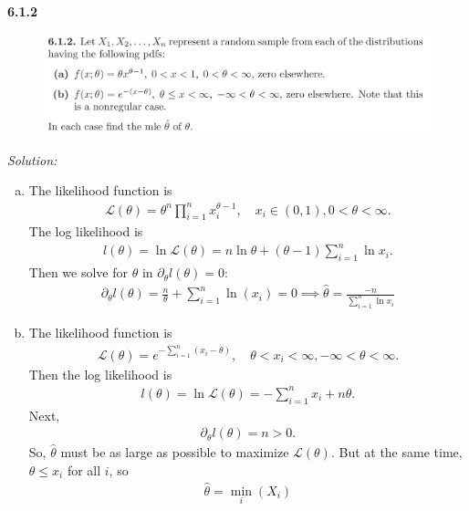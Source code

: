 \documentclass{book}
\theoremstyle{definition}
\newcommand{\p}{\partial}
\newcommand{\lag}{\mathcal{L}}
\newcommand{\f}[2]{\frac{#1}{#2}}
\begin{document}
\newpage
\noindent \textbf{6.1.2}
\begin{figure}[!htb]
	\centering
	\includegraphics[scale=0.25]{612}
\end{figure}


\noindent \textit{Solution:} 
\begin{enumerate}[(a)]
	\item The likelihood function is 
	\begin{align}
	\lag(\theta) = \theta^n \prod^n_{i=1} x_i^{\theta - 1}, \quad x_i \in (0,1), 0 < \theta < \infty.
	\end{align}
	The log likelihood is
	\begin{align}
	l(\theta) = \ln \lag(\theta) = n \ln \theta + (\theta - 1)\sum^n_{i=1}\ln x_i.
	\end{align}
	Then we solve for $\theta$ in $\p_\theta l(\theta) = 0$:
	\begin{align}
	\p_\theta l(\theta) = \f{n}{\theta} + \sum^n_{i=1}\ln (x_i) = 0 \implies \boxed{\hat\theta = \f{-n}{\sum^n_{i=1}\ln x_i} }
	\end{align}
	
	
	
	
	
	
	
	\item The likelihood function is 
	\begin{align}
	\lag(\theta) = e^{-\sum^n_{i=1}(x_i - \theta)}, \quad \theta < x_i < \infty, -\infty < \theta < \infty.
	\end{align}
	Then the log likelihood is
	\begin{align}
	l(\theta) = \ln \lag(\theta) = -\sum^n_{i=1} x_i + n\theta.
	\end{align}
	Next,
	\begin{align}
	\p_\theta l(\theta) = n > 0.
	\end{align}
	So, $\hat\theta$ must be as large as possible to maximize $\lag(\theta)$. But at the same time, $\theta \leq x_i$ for all $i$, so 
	\begin{align}
	\boxed{\hat\theta = \min_i (X_i)}
	\end{align}
	
	
	
\end{enumerate}
\end{document}
